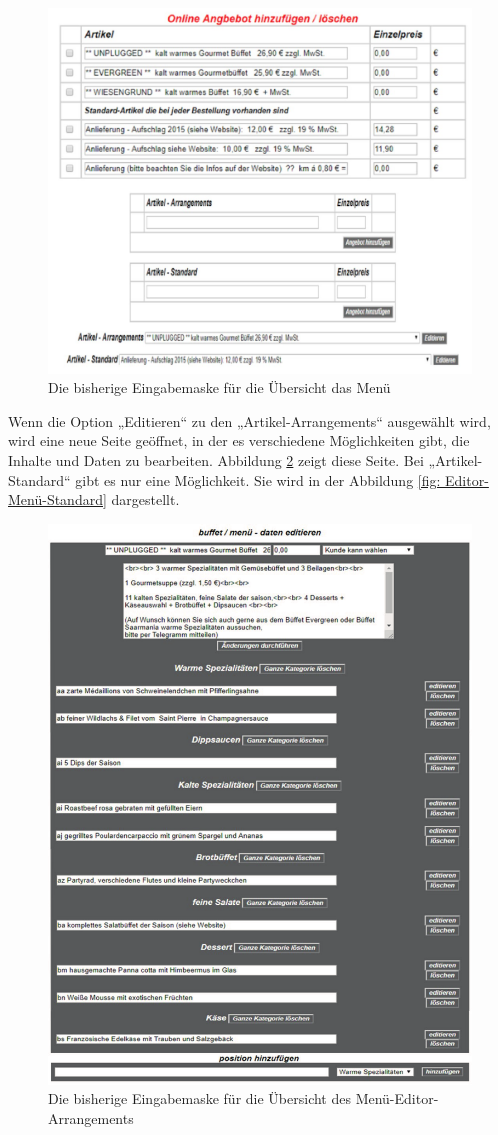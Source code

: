 \pagebreak

\begin{figure}[h]
	\centering
	\includegraphics[width=0.7\linewidth]{Graphics/menue-uebesicht.png}
	\caption[Kundeansicht]{Die bisherige Eingabemaske für die Übersicht das Menü}
	\label{fig: Online-EditorUebersicht}
\end{figure}

Wenn die Option „Editieren“ zu den „Artikel-Arrangements“ ausgewählt wird, wird eine neue Seite geöffnet, in der es verschiedene Möglichkeiten gibt, die Inhalte und Daten zu bearbeiten. Abbildung \ref{fig: Editor-Menü2} zeigt diese Seite.
Bei „Artikel-Standard“ gibt es nur eine Möglichkeit. Sie wird in der Abbildung \ref{fig: Editor-Menü-Standard} dargestellt.

\begin{figure}[h]
	\centering
	\includegraphics[width=0.7\linewidth]{Graphics/arrangement-Menue-editor.pdf}
		\caption[Kun2deansicht]{Die bisherige Eingabemaske für die Übersicht des Menü-Editor-Arrangements}
	\label{fig: Editor-Menü2}
\end{figure}

